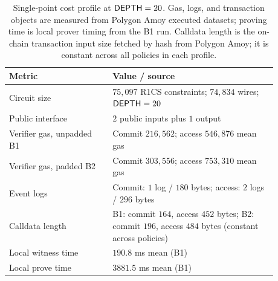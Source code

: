\begin{table}[t]
  \centering
  \caption{Single-point cost profile at $\mathsf{DEPTH}=20$. Gas, logs, and transaction objects are
    measured from Polygon Amoy executed datasets; proving time is local prover timing
    from the B1 run. Calldata length is the on-chain transaction input size fetched by
    hash from Polygon Amoy; it is constant across all policies in each profile.}
  \label{tab:cost-profile}
  \footnotesize
  \begin{tabular}{p{0.34\linewidth}p{0.54\linewidth}}
    \toprule
    Metric & Value / source \\
    \midrule
    Circuit size & $75{,}097$ R1CS constraints; $74{,}834$ wires; $\mathsf{DEPTH}=20$ \\
    Public interface & $2$ public inputs plus $1$ output \\
    Verifier gas, unpadded B1 & Commit $216{,}562$; access $546{,}876$ mean gas \\
    Verifier gas, padded B2 & Commit $303{,}556$; access $753{,}310$ mean gas \\
    Event logs & Commit: $1$ log / $180$ bytes; access: $2$ logs / $296$ bytes \\
    Calldata length & B1: commit $164$, access $452$ bytes; B2: commit $196$, access $484$ bytes (constant across policies) \\
    Local witness time & $190.8$ ms mean (B1) \\
    Local prove time & $3881.5$ ms mean (B1) \\
    \bottomrule
  \end{tabular}
\end{table}
